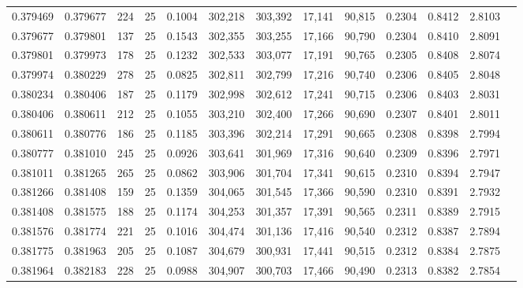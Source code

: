 \begin{tabular}{rrrrrrrrrrrrr}
0.379469 & 0.379677 &   224 &  25 &                                     0.1004 & 302,218 & 303,392 &  17,141 &  90,815 & 0.2304 & 0.8412 & 2.8103 \\
0.379677 & 0.379801 &   137 &  25 &                                     0.1543 & 302,355 & 303,255 &  17,166 &  90,790 & 0.2304 & 0.8410 & 2.8091 \\
0.379801 & 0.379973 &   178 &  25 &                                     0.1232 & 302,533 & 303,077 &  17,191 &  90,765 & 0.2305 & 0.8408 & 2.8074 \\
0.379974 & 0.380229 &   278 &  25 &                                     0.0825 & 302,811 & 302,799 &  17,216 &  90,740 & 0.2306 & 0.8405 & 2.8048 \\
0.380234 & 0.380406 &   187 &  25 &                                     0.1179 & 302,998 & 302,612 &  17,241 &  90,715 & 0.2306 & 0.8403 & 2.8031 \\
0.380406 & 0.380611 &   212 &  25 &                                     0.1055 & 303,210 & 302,400 &  17,266 &  90,690 & 0.2307 & 0.8401 & 2.8011 \\
0.380611 & 0.380776 &   186 &  25 &                                     0.1185 & 303,396 & 302,214 &  17,291 &  90,665 & 0.2308 & 0.8398 & 2.7994 \\
0.380777 & 0.381010 &   245 &  25 &                                     0.0926 & 303,641 & 301,969 &  17,316 &  90,640 & 0.2309 & 0.8396 & 2.7971 \\
0.381011 & 0.381265 &   265 &  25 &                                     0.0862 & 303,906 & 301,704 &  17,341 &  90,615 & 0.2310 & 0.8394 & 2.7947 \\
0.381266 & 0.381408 &   159 &  25 &                                     0.1359 & 304,065 & 301,545 &  17,366 &  90,590 & 0.2310 & 0.8391 & 2.7932 \\
0.381408 & 0.381575 &   188 &  25 &                                     0.1174 & 304,253 & 301,357 &  17,391 &  90,565 & 0.2311 & 0.8389 & 2.7915 \\
0.381576 & 0.381774 &   221 &  25 &                                     0.1016 & 304,474 & 301,136 &  17,416 &  90,540 & 0.2312 & 0.8387 & 2.7894 \\
0.381775 & 0.381963 &   205 &  25 &                                     0.1087 & 304,679 & 300,931 &  17,441 &  90,515 & 0.2312 & 0.8384 & 2.7875 \\
0.381964 & 0.382183 &   228 &  25 &                                     0.0988 & 304,907 & 300,703 &  17,466 &  90,490 & 0.2313 & 0.8382 & 2.7854 \\

\end{tabular}
